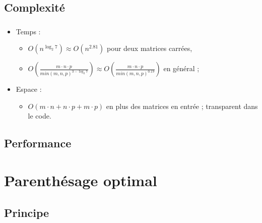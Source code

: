 \documentclass{beamer}
\begin{document}
\subsection{Complexité}
\begin{frame}
  \frametitle{\insertsubsection}
  \begin{itemize}
    \item Temps :
    \begin{itemize}
      \item $O(n^{\log_2 7})\approx O(n^{2.81})$
      pour deux matrices carrées,
      \item $O(\frac{m\cdot n\cdot p}{min(m,n,p)^{3-\log_2 7}})\approx
      O(\frac{m\cdot n\cdot p}{min(m,n,p)^{0.19}})$
      en général ;
    \end{itemize}
    \item Espace :
    \begin{itemize}
      \item $O(m\cdot n+n\cdot p+m\cdot p)$ en plus des matrices en entrée ;
      transparent dans le code.
    \end{itemize}
  \end{itemize}
\end{frame}

\subsection{Performance}
\begin{frame}
  \frametitle{\insertsubsection}
\end{frame}


\section{Parenthésage optimal}
\subsection{Principe}
\begin{frame}
  \frametitle{\insertsubsection}
\end{frame}
\end{document}
